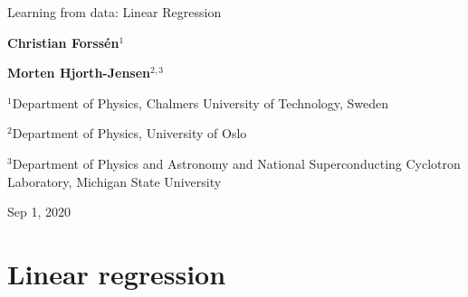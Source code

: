 \documentclass[%
oneside,                 %
final,                   %
10pt]{article}
\begin{document}

\newcommand{\exercisesection}[1]{\subsection*{#1}}







\thispagestyle{empty}

\begin{center}
{\LARGE\bf
\begin{spacing}{1.25}
Learning from data: Linear Regression
\end{spacing}
}
\end{center}


\begin{center}
{\bf Christian Forssén${}^{1}$} \\ [0mm]
\end{center}


\begin{center}
{\bf Morten Hjorth-Jensen${}^{2, 3}$} \\ [0mm]
\end{center}

\begin{center}
\centerline{{\small ${}^1$Department of Physics, Chalmers University of Technology, Sweden}}
\centerline{{\small ${}^2$Department of Physics, University of Oslo}}
\centerline{{\small ${}^3$Department of Physics and Astronomy and National Superconducting Cyclotron Laboratory, Michigan State University}}
\end{center}
    

\begin{center}
Sep 1, 2020
\end{center}

\vspace{1cm}


\section{Linear regression}
\end{document}
